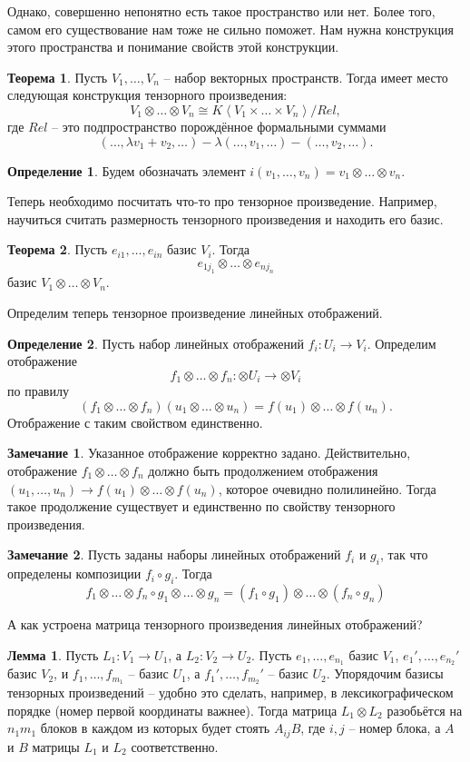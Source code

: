 \documentclass[10pt,a4paper,oneside]{book}
\theoremstyle{definition}
\newtheorem*{rem}{Замечание}
\newtheorem*{defn}{Определение}
\newtheorem{thm}{Теорема}
\newtheorem{lem}{Лемма}
\def\lan{\left\langle }
\def\ran{\right\rangle}
\def\thrm{\begin{thm}}
\def\ethrm{\end{thm}}
\def\dfn{\begin{defn}}
\def\edfn{\end{defn}}
\def\lm{\begin{lem}}
\def\elm{\end{lem}}
\def\rm{\begin{rem}}
\def\erm{\end{rem}}
\begin{document}
Однако, совершенно непонятно есть такое пространство или нет. Более того, самом его существование нам тоже не сильно поможет. Нам нужна конструкция этого пространства и понимание свойств этой конструкции.

\thrm Пусть $V_1,\dots,V_n$ -- набор векторных пространств. Тогда имеет место следующая конструкция тензорного произведения:
$$V_1 \otimes \dots \otimes V_n \cong K\lan V_1 \times \dots \times V_n \ran / Rel,$$
где $Rel$ -- это подпространство порождённое формальными суммами
$$(\dots, \lambda v_1+v_2, \dots) - \lambda (\dots,v_1, \dots) - (\dots, v_2, \dots).$$ 
\ethrm

\dfn Будем обозначать элемент $i(v_1,\dots,v_n)=v_1\otimes \dots \otimes v_n$. 
\edfn

Теперь необходимо посчитать что-то про тензорное произведение. Например, научиться считать размерность тензорного произведения и находить его базис.
\thrm Пусть $e_{i1},\dots,e_{in}$ базис $V_i$. Тогда $$e_{1j_1}\otimes \dots \otimes e_{nj_n}$$ базис $V_1 \otimes \dots \otimes V_n$.
\ethrm



Определим теперь тензорное произведение линейных отображений.

\dfn Пусть набор линейных отображений $f_i \colon U_i \to V_i$. Определим отображение $$f_1\otimes \dots \otimes f_n \colon \otimes U_i \to \otimes V_i$$ по  правилу $$(f_1\otimes \dots \otimes f_n) (u_1\otimes \dots \otimes u_n) = f(u_1)\otimes \dots \otimes f(u_n).$$
Отображение с таким свойством единственно.
\edfn

\rm Указанное отображение корректно задано. Действительно,  отображение $f_1\otimes \dots \otimes f_n$ должно быть продолжением отображения $(u_1,\dots,u_n) \to f(u_1) \otimes \dots \otimes f(u_n)$, которое очевидно полилинейно. Тогда такое продолжение существует и единственно по свойству тензорного произведения. 
\erm

\rm Пусть заданы наборы линейных отображений $f_i$ и $g_i$, так что определены композиции $f_i\circ g_i$. Тогда $$f_1\otimes \dots \otimes f_n \circ g_1\otimes \dots \otimes g_n=(f_1\circ g_1)\otimes \dots \otimes (f_n\circ g_n)$$
\erm 

А как устроена матрица тензорного произведения линейных отображений?


\lm Пусть $L_1 \colon V_1 \to U_1$, а $L_2 \colon V_2 \to U_2$. Пусть $e_1,\dots, e_{n_1}$ базис $V_1$,  $e_1',\dots, e_{n_2}'$ базис $V_2$,  и $f_1,\dots, f_{m_1}$ -- базис $U_1$, а $f_1',\dots, f_{m_2}'$ -- базис $U_2$. 
Упорядочим базисы тензорных произведений -- удобно это сделать, например, в лексикографическом порядке (номер первой координаты важнее).
Тогда матрица  $L_1\otimes L_2$  разобьётся на $n_1m_1$ блоков в каждом из которых будет стоять $ A_{ij} B$, где $i,j$ -- номер блока, а $A$ и $B$ матрицы $L_1$ и $L_2$ соответственно.
\elm
\end{document}

